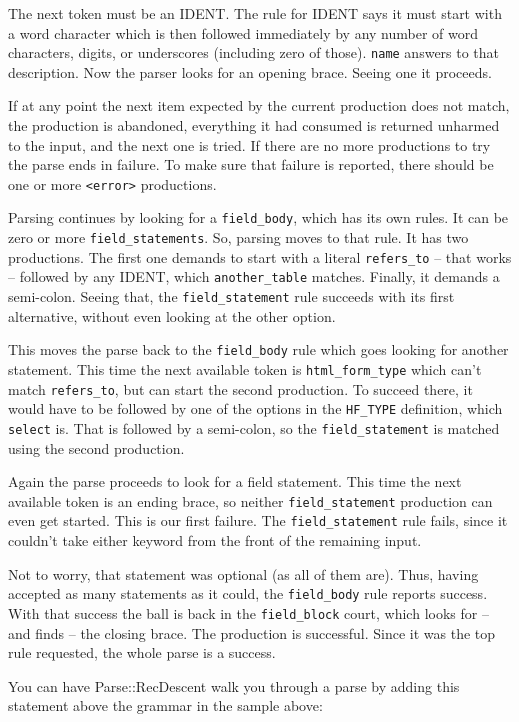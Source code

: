 The next token must be an IDENT.  The rule for IDENT says it must
start with a word character which is then followed immediately by
any number of word characters, digits, or underscores (including zero of those).
\verb+name+ answers to that description.  Now the parser
looks for an opening brace.  Seeing one it proceeds.

If at any point the next item expected by the current production does not
match, the production is abandoned, everything it had consumed is returned
unharmed to the input, and the next one is tried.  If there are no more
productions to try the parse ends in failure.  To make sure that failure
is reported, there should be one or more \verb+<error>+ productions.

Parsing continues by looking for a \verb+field_body+, which has its own
rules.  It can be zero or more \verb+field_statements+.  So, parsing
moves to that rule.  It has two productions.  The first one demands to start
with a literal \verb+refers_to+ -- that works -- followed
by any IDENT, which \verb+another_table+ matches.  Finally, it demands
a semi-colon.  Seeing that, the \verb+field_statement+ rule succeeds with
its first alternative, without even looking at the other option.

This moves the parse back to the \verb+field_body+ rule which goes looking
for another statement.  This time the next available token is
\verb+html_form_type+ which can't match \verb+refers_to+, but can
start the second production.  To succeed there, it would have to
be followed by one of the options in the \verb+HF_TYPE+ definition,
which \verb+select+ is.  That is followed by a semi-colon, so
the \verb+field_statement+ is matched using the second production.

Again the parse proceeds to look for a field statement.  This time the
next available token is an ending brace, so neither \verb+field_statement+
production can even get started.  This is our first failure.
The \verb+field_statement+ rule fails, since it couldn't take either keyword
from the front of the remaining input.

Not to worry, that statement was optional (as all of them are).  Thus,
having accepted as many statements as it could, the \verb+field_body+
rule reports success.  With that success the ball is back in the
\verb+field_block+ court, which looks for -- and finds -- the closing brace.
The production is successful.  Since it was the top rule requested, the whole
parse is a success.

You can have Parse::RecDescent walk you through a parse by adding this
statement above the grammar in the sample above:

